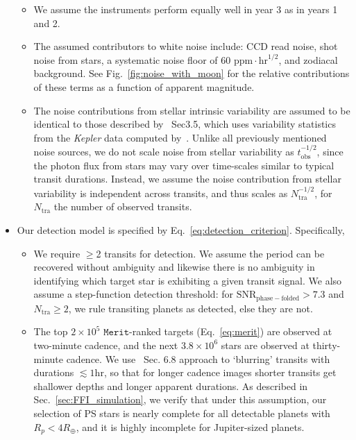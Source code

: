 \begin{itemize}
\begin{itemize}
	 \item We assume the instruments perform equally well in year 3
           as in years 1 and 2.
           
	 \item The assumed contributors to white noise include: CCD
           read noise, shot noise from stars, a systematic noise floor
           of 60 $\mathrm{ppm}\cdot\mathrm{hr}^{1/2}$, and zodiacal
           background. See Fig.~\ref{fig:noise_with_moon} for the
           relative contributions of these terms as a function of
           apparent magnitude.
           
	\item The noise contributions from stellar intrinsic
          variability are assumed to be identical to those described
          by~ Sec3.5, which uses variability
          statistics from the \textit{Kepler} data computed
          by~\citet{basri_comparison_2013}.  Unlike all previously
          mentioned noise sources, we do not scale noise from stellar
          variability as $t_\mathrm{obs}^{-1/2}$, since the photon
          flux from stars may vary over time-scales similar to typical
          transit durations.  Instead, we assume the noise
          contribution from stellar variability is independent across
          transits, and thus scales as $N_\mathrm{tra}^{-1/2}$, for
          $N_\mathrm{tra}$ the number of observed transits.
	  \end{itemize}
          
	\item Our detection model is specified by Eq.~\ref{eq:detection_criterion}.
	Specifically,

	  \begin{itemize}
                
    \item We require $\geq$2 transits for detection.  We assume
	     the period can be recovered without ambiguity and likewise
	     there is no ambiguity in identifying which target star is
	     exhibiting a given transit signal.
		We also assume a step-function detection threshold: for 
	  $\mathrm{SNR_\mathrm{phase-folded}} > 7.3$ and $N_\mathrm{tra} \geq 2$, 
	  we rule transiting 
	  planets as detected, else they are not.
            
	\item The top $2\times 10^5$ $\mathtt{Merit}$-ranked targets
          (Eq.~\ref{eq:merit}) are observed at two-minute cadence, and
          the next $3.8\times10^6$ stars are observed at thirty-minute
          cadence.  We use~ Sec. 6.8
          approach to `blurring' transits with durations $\lesssim
          1\mathrm{hr}$, so that for longer cadence images shorter
          transits get shallower depths and longer apparent durations.
          As described in Sec.~\ref{sec:FFI_simulation}, we verify
          that under this assumption, our selection of PS stars is
          nearly complete for all detectable planets with
          $R_p<4R_\oplus$, and it is highly incomplete for Jupiter-sized planets.


\end{itemize}
\end{itemize}
